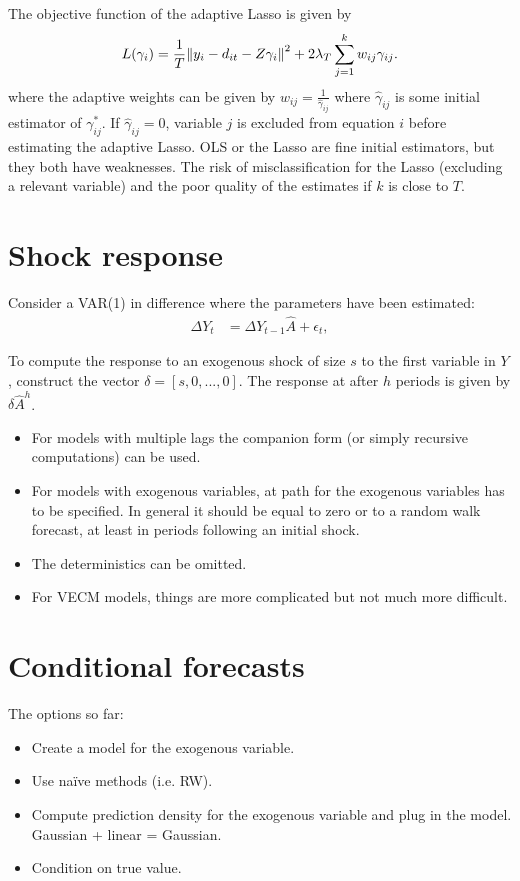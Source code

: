 \documentclass[11pt,oneside, a4paper]{amsart}
\begin{document}
The objective function of the adaptive Lasso is given by 
\begin{align}
L(\gamma_{i})=\frac{1}{T}\enVert{y_{i}-d_{it}-Z\gamma_{i}}^2+2\lambda_T\sum_{j=1}^{k}w_{ij}\gamma_{ij}\label{eq:objada}.
\end{align}
where the adaptive weights can be given by $w_{ij}=\frac{1}{\hat\gamma_{ij}}$ where $\hat\gamma_{ij}$ is some initial estimator of $\gamma^*_{ij}$. If $\hat\gamma_{ij}=0$, variable $j$ is excluded from equation $i$ before estimating the adaptive Lasso. OLS or the Lasso are fine initial estimators, but they both have weaknesses. The risk of misclassification for the Lasso (excluding a relevant variable) and the poor quality of the estimates if $k$ is close to $T$.    



\section*{Shock response}

Consider a VAR(1) in difference where the parameters have been estimated:
\begin{align}
\Delta Y_t &= \Delta Y_{t-1} \hat A + \epsilon_t,\nonumber
\end{align}

To compute the response to an exogenous shock of size $s$ to the first variable in $Y$, construct the vector $\delta =[s,0,...,0]$. The response at after $h$ periods is given by $\delta \hat A^h$. 
\begin{itemize}
\item For models with multiple lags the companion form (or simply recursive computations) can be used.
\item For models with exogenous variables, at path for the exogenous variables has to be specified. In general it should be equal to zero or to a random walk forecast, at least in periods following an initial shock. 
\item The deterministics can be omitted. 
\item For VECM models, things are more complicated but not much more difficult.    
\end{itemize}


\section*{Conditional forecasts}

The options so far:
\begin{itemize}
\item Create a model for the exogenous variable. 
\item Use na\"{i}ve methods (i.e. RW).
\item Compute prediction density for the exogenous variable and plug in the model. Gaussian + linear = Gaussian.
\item Condition on true value. 
\end{itemize}
\end{document}
